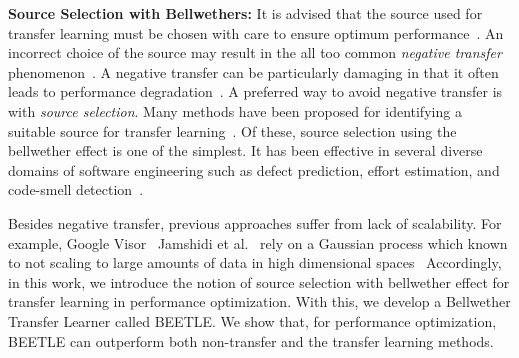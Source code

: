 \documentclass[10pt,journal,compsoc]{IEEEtran}
\begin{document}
\noindent\textbf{Source Selection with Bellwethers: }
It is advised that the source used for transfer learning must be chosen with care to ensure optimum performance~\cite{yosinski2014transferable, 
long2015, afridi2018}. An incorrect choice of the source may result in the all too 
common \textit{negative transfer} 
phenomenon~\cite{afridi2018, ben2003, rosenstein2005,pan2010}. A negative transfer can be particularly damaging in that it often leads to performance 
degradation~\cite{jamshidi2017transfer2, afridi2018}. 
A preferred way to avoid negative transfer is with \textit{source 
selection}. Many methods have been proposed for identifying a suitable source for transfer learning~\cite{krishna18, krishna16, afridi2018}. Of these, source
selection using the bellwether effect is one of the simplest. It has been effective in several diverse domains of software engineering such as defect prediction, effort estimation, and code-smell detection~\cite{krishna18, 
mensah17a, 
mensah17b}. 

Besides negative transfer, previous approaches suffer from lack of scalability. For example, Google Visor~\cite{golovin2017google} Jamshidi et al.~\cite{jamshidi2017transfer} rely on a Gaussian process which known to   not scaling to large amounts of data in high dimensional spaces~\cite{rasmussen2004gaussian}
Accordingly, in this work, we introduce the notion of source selection with bellwether effect for transfer learning in performance optimization. With this, 
we develop a Bellwether Transfer Learner called BEETLE. We show that, for performance optimization, BEETLE can outperform both non-transfer and the transfer learning methods.    
\end{document}
